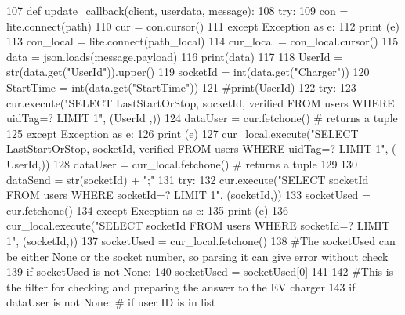 \begin{DoxyCode}
107 \textcolor{keyword}{def }\hyperlink{namespace_s_q_lfunction_ae16644514ae2cdbf375884361531f691}{update\_callback}(client, userdata, message):
108     \textcolor{keywordflow}{try}:
109         con = lite.connect(path)
110         cur = con.cursor()
111     \textcolor{keywordflow}{except} Exception \textcolor{keyword}{as} e:
112         \textcolor{keywordflow}{print} (e)
113     con\_local = lite.connect(path\_local)
114     cur\_local = con\_local.cursor()
115     data = json.loads(message.payload)
116     print(data)
117     
118     UserId = str(data.get(\textcolor{stringliteral}{"UserId"})).upper()
119     socketId = int(data.get(\textcolor{stringliteral}{"Charger"}))
120     StartTime = int(data.get(\textcolor{stringliteral}{"StartTime"}))
121     \textcolor{comment}{#print(UserId)}
122     \textcolor{keywordflow}{try}:
123         cur.execute(\textcolor{stringliteral}{"SELECT LastStartOrStop, socketId, verified FROM users WHERE uidTag=? LIMIT 1"}, (UserId
      ,))
124         dataUser = cur.fetchone() \textcolor{comment}{# returns a tuple}
125     \textcolor{keywordflow}{except} Exception \textcolor{keyword}{as} e:
126         \textcolor{keywordflow}{print} (e)
127         cur\_local.execute(\textcolor{stringliteral}{"SELECT LastStartOrStop, socketId, verified FROM users WHERE uidTag=? LIMIT 1"}, (
      UserId,))
128         dataUser = cur\_local.fetchone() \textcolor{comment}{# returns a tuple}
129     
130     dataSend = str(socketId) + \textcolor{stringliteral}{";"}
131     \textcolor{keywordflow}{try}:
132         cur.execute(\textcolor{stringliteral}{"SELECT socketId FROM users WHERE socketId=? LIMIT 1"}, (socketId,))
133         socketUsed = cur.fetchone()
134     \textcolor{keywordflow}{except} Exception \textcolor{keyword}{as} e:
135         \textcolor{keywordflow}{print} (e)
136         cur\_local.execute(\textcolor{stringliteral}{"SELECT socketId FROM users WHERE socketId=? LIMIT 1"}, (socketId,))
137         socketUsed = cur\_local.fetchone()
138     \textcolor{comment}{#The socketUsed can be either None or the socket number, so parsing it can give error without check}
139     \textcolor{keywordflow}{if} socketUsed \textcolor{keywordflow}{is} \textcolor{keywordflow}{not} \textcolor{keywordtype}{None}:
140         socketUsed = socketUsed[0]
141         
142     \textcolor{comment}{#This is the filter for checking and preparing the answer to the EV charger}
143     \textcolor{keywordflow}{if} dataUser \textcolor{keywordflow}{is} \textcolor{keywordflow}{not} \textcolor{keywordtype}{None}: \textcolor{comment}{# if user ID is in list}

\end{DoxyCode}

